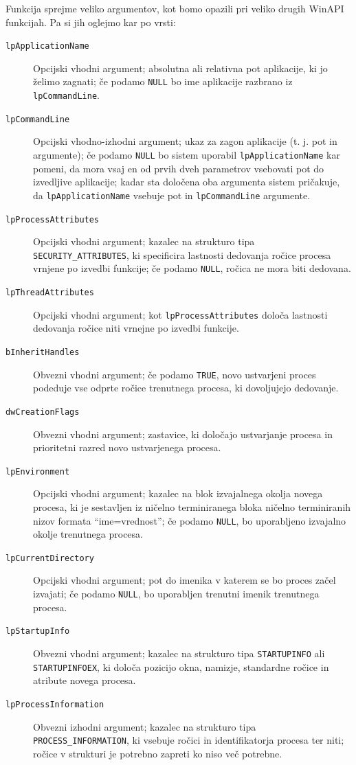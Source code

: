 \documentclass[a4paper,12pt,openright]{book}
\begin{document}
Funkcija sprejme veliko argumentov, kot bomo opazili pri veliko drugih WinAPI funkcijah.
Pa si jih oglejmo kar po vrsti:
\begin{description}
	\item[\texttt{lpApplicationName}] Opcijski vhodni argument; absolutna ali relativna pot aplikacije, ki jo želimo zagnati; če podamo \texttt{NULL} bo ime aplikacije razbrano iz \texttt{lpCommandLine}.
	\item[\texttt{lpCommandLine}] Opcijski vhodno-izhodni argument; ukaz za zagon aplikacije (t. j. pot in argumente); če podamo \texttt{NULL} bo sistem uporabil \texttt{lpApplicationName} kar pomeni, da mora vsaj en od prvih dveh parametrov vsebovati pot do izvedljive aplikacije; kadar sta določena oba argumenta sistem pričakuje, da \texttt{lpApplicationName} vsebuje pot in \texttt{lpCommandLine} argumente.
	\item[\texttt{lpProcessAttributes}] Opcijski vhodni argument; kazalec na strukturo tipa \texttt{SECURITY\_ATTRIBUTES}, ki specificira lastnosti dedovanja ročice procesa vrnjene po izvedbi funkcije; če podamo \texttt{NULL}, ročica ne mora biti dedovana.
	\item[\texttt{lpThreadAttributes}] Opcijski vhodni argument; kot \texttt{lpProcessAttributes} določa lastnosti dedovanja ročice niti vrnejne po izvedbi funkcije.
	\item[\texttt{bInheritHandles}] Obvezni vhodni argument; če podamo \texttt{TRUE}, novo ustvarjeni proces podeduje vse odprte ročice trenutnega procesa, ki dovoljujejo dedovanje.
	\item[\texttt{dwCreationFlags}] Obvezni vhodni argument; zastavice, ki določajo ustvarjanje procesa in prioritetni razred novo ustvarjenega procesa.
	\item[\texttt{lpEnvironment}] Opcijski vhodni argument; kazalec na blok izvajalnega okolja novega procesa, ki je sestavljen iz ničelno terminiranega bloka ničelno terminiranih nizov formata ``ime=vrednost''; če podamo \texttt{NULL}, bo uporabljeno izvajalno okolje trenutnega procesa.
	\item[\texttt{lpCurrentDirectory}] Opcijski vhodni argument; pot do imenika v katerem se bo proces začel izvajati; če podamo \texttt{NULL}, bo uporabljen trenutni imenik trenutnega procesa.
	\item[\texttt{lpStartupInfo}] Obvezni vhodni argument; kazalec na strukturo tipa \texttt{STARTUP\-INFO} ali \texttt{STARTUPINFOEX}, ki določa pozicijo okna, namizje, standardne ročice in atribute novega procesa.
	\item[\texttt{lpProcessInformation}] Obvezni izhodni argument; kazalec na strukturo tipa \texttt{PROCESS\-\_INFORMATION}, ki vsebuje ročici in identifikatorja procesa ter niti; ročice v strukturi je potrebno zapreti ko niso več potrebne.
\end{description}
\end{document}
